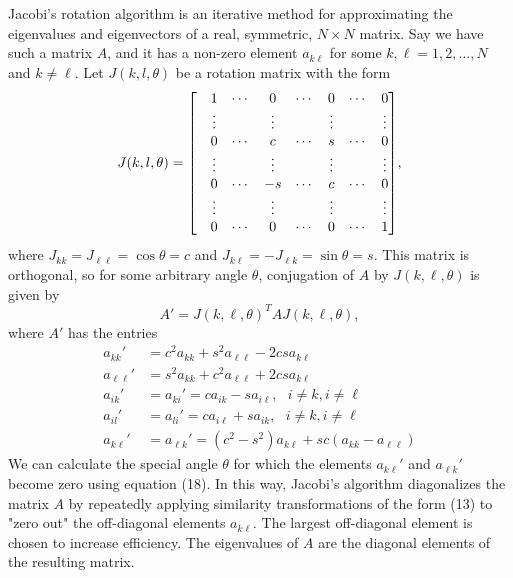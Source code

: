 \documentclass[prb,aps,twocolumn,showpacs,10pt]{revtex4-1}
\newenvironment{psmallmatrix}
  {\left[\begin{matrix}}
  {\end{matrix}\right]}
\begin{document}
Jacobi's rotation algorithm is an iterative method for approximating the eigenvalues and eigenvectors of a real, symmetric, $N\times N$ matrix. Say we have such a matrix  $A$, and it has a non-zero element $a_{k\ell}$ for some $k, \ell = 1,2,...,N$ and $k\neq \ell$. Let $J(k,l,\theta)$ be a rotation matrix with the form
\begin{equation}
J(k,l,\theta) = \begin{psmallmatrix}
&1&\cdots &0 &\cdots &0 &\cdots &0\\
&\vdots& &\vdots & &\vdots & &\vdots\\
&0&\cdots &c &\cdots &s &\cdots &0\\
&\vdots& &\vdots & &\vdots & &\vdots\\
&0&\cdots &-s &\cdots &c &\cdots &0\\
&\vdots& &\vdots & &\vdots & &\vdots\\
&0&\cdots &0 &\cdots &0 &\cdots &1\\
\end{psmallmatrix},
\end{equation}
where $J_{kk}=J_{\ell\ell}=\cos\theta=c$ and $J_{k\ell}=-J_{\ell k}=\sin\theta=s$. This matrix is orthogonal, so for some arbitrary angle $\theta$, conjugation of $A$ by $J(k,\ell,\theta)$ is given by
\begin{equation}
A'=J(k,\ell,\theta)^T A J(k,\ell,\theta),
\end{equation}
where $A'$ has the entries 
\begin{align}
a_{kk}'&=c^2a_{kk}+s^2a_{\ell\ell}-2csa_{k\ell}\\
a_{\ell\ell}'&=s^2a_{kk}+c^2a_{\ell\ell}+2csa_{k\ell}\\
a_{ik}'&=a_{ki}'=ca_{ik}-sa_{i\ell}, \ \ \ i\neq k, i \neq \ell\\
a_{il}'&=a_{li}'=ca_{i\ell}+sa_{ik}, \ \ \ i\neq k, i \neq \ell\\
a_{k\ell}'&=a_{\ell k}'=(c^2-s^2)a_{k\ell}+sc(a_{kk}-a_{\ell\ell})
\end{align}
We can calculate the special angle $\theta$ for which the elements $a_{k\ell}'$ and $a_{\ell k}'$ become zero using equation (18). In this way, Jacobi's algorithm diagonalizes the matrix $A$ by repeatedly applying similarity transformations of the form (13) to "zero out" the off-diagonal elements $a_{k\ell}$. The largest off-diagonal element is chosen to increase efficiency. The eigenvalues of $A$ are the diagonal elements of the resulting matrix.\\
\end{document}
